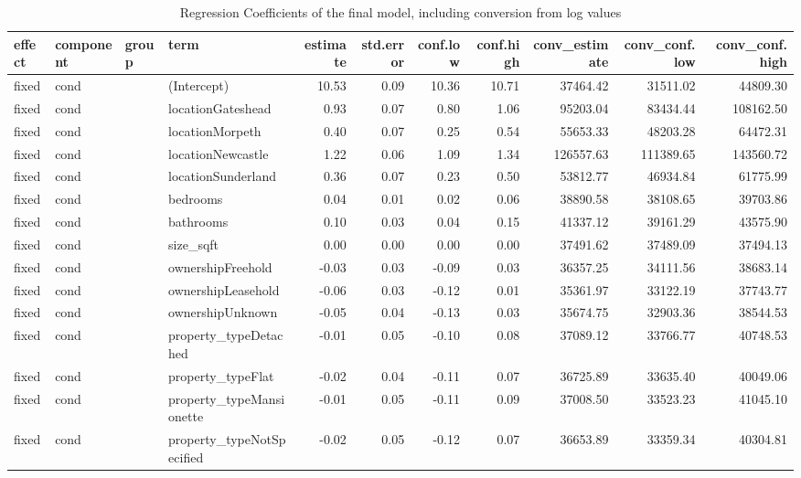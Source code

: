 \begin{table}[ht]
\centering
\caption{Regression Coefficients of the final model, including conversion from log values} 
\label{tab:regcoef}
\begin{tabular}{llllrrrrrrr}
  \hline
effect & component & group & term & estimate & std.error & conf.low & conf.high & conv\_estimate & conv\_conf.low & conv\_conf.high \\ 
  \hline
fixed & cond &  & (Intercept) & 10.53 & 0.09 & 10.36 & 10.71 & 37464.42 & 31511.02 & 44809.30 \\ 
  fixed & cond &  & locationGateshead & 0.93 & 0.07 & 0.80 & 1.06 & 95203.04 & 83434.44 & 108162.50 \\ 
  fixed & cond &  & locationMorpeth & 0.40 & 0.07 & 0.25 & 0.54 & 55653.33 & 48203.28 & 64472.31 \\ 
  fixed & cond &  & locationNewcastle & 1.22 & 0.06 & 1.09 & 1.34 & 126557.63 & 111389.65 & 143560.72 \\ 
  fixed & cond &  & locationSunderland & 0.36 & 0.07 & 0.23 & 0.50 & 53812.77 & 46934.84 & 61775.99 \\ 
  fixed & cond &  & bedrooms & 0.04 & 0.01 & 0.02 & 0.06 & 38890.58 & 38108.65 & 39703.86 \\ 
  fixed & cond &  & bathrooms & 0.10 & 0.03 & 0.04 & 0.15 & 41337.12 & 39161.29 & 43575.90 \\ 
  fixed & cond &  & size\_sqft & 0.00 & 0.00 & 0.00 & 0.00 & 37491.62 & 37489.09 & 37494.13 \\ 
  fixed & cond &  & ownershipFreehold & -0.03 & 0.03 & -0.09 & 0.03 & 36357.25 & 34111.56 & 38683.14 \\ 
  fixed & cond &  & ownershipLeasehold & -0.06 & 0.03 & -0.12 & 0.01 & 35361.97 & 33122.19 & 37743.77 \\ 
  fixed & cond &  & ownershipUnknown & -0.05 & 0.04 & -0.13 & 0.03 & 35674.75 & 32903.36 & 38544.53 \\ 
  fixed & cond &  & property\_typeDetached & -0.01 & 0.05 & -0.10 & 0.08 & 37089.12 & 33766.77 & 40748.53 \\ 
  fixed & cond &  & property\_typeFlat & -0.02 & 0.04 & -0.11 & 0.07 & 36725.89 & 33635.40 & 40049.06 \\ 
  fixed & cond &  & property\_typeMansionette & -0.01 & 0.05 & -0.11 & 0.09 & 37008.50 & 33523.23 & 41045.10 \\ 
  fixed & cond &  & property\_typeNotSpecified & -0.02 & 0.05 & -0.12 & 0.07 & 36653.89 & 33359.34 & 40304.81 \\ 

\end{tabular}
\end{table}
